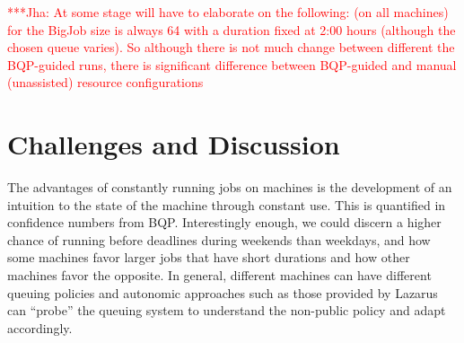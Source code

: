 \documentclass{sig-alternate}
\newcommand{\up}{\vspace*{-0.3em}}
\newcommand{\jhanote}[1]{ {\textcolor{red} { ***Jha: #1 }}}
\newcommand{\jhanote}[1]{}
\begin{document}
\up\up
\begin{table}
\caption{A table showing  the selected configuration of the resources
  and the numer of times a particular configuration is chosen, when 
  the decision is guided by BQP. Data in this table corresponds to
  RQA-BQP; the experiments are repeated ten times.  As can be seen, 
  the use of BQP results in a variable choice of resource  configuration on  different machines.  In contrast, when BQP is not used,  the default choice
  if fixed.}\up\up\up\up\up\up
\end{table}

\jhanote{At some stage will have to elaborate on the following: (on all machines) for the BigJob size is always 64 with a duration fixed at 2:00 hours (although the chosen queue varies). So although there is not much change between different the BQP-guided runs, there is significant difference between BQP-guided and manual (unassisted) resource configurations}

\section{Challenges and Discussion}

The advantages of constantly running jobs on machines is the
development of an intuition to the state of the machine through
constant use. This is quantified in confidence numbers from
BQP. Interestingly enough, we could discern a higher chance of running
before deadlines during weekends than weekdays, and how some machines
favor larger jobs that have short durations and how other machines
favor the opposite. In general, different machines can have different
queuing policies and autonomic approaches such as those provided by
Lazarus can ``probe'' the queuing system to understand the non-public
policy and adapt accordingly.
\end{document}
